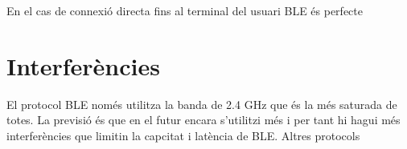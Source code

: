 En el cas de connexió directa fins al terminal del usuari BLE és perfecte

\section{Interferències}

El protocol BLE només utilitza la banda de 2.4 GHz que és la més saturada de totes.
La previsió és que en el futur encara s'utilitzi més i per tant hi hagui més interferències que limitin la capcitat i latència de BLE.
Altres protocols 